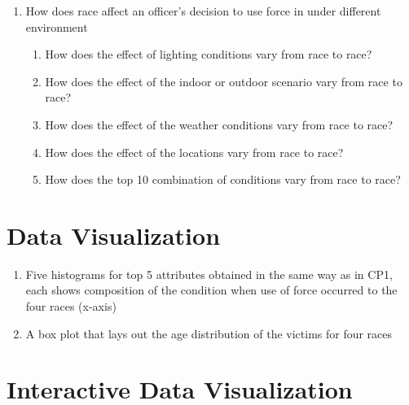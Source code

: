 \documentclass[10pt]{article}
\begin{document}
\begin{enumerate}
\item How does race affect an officer's decision to use force in under different environment

    \begin{enumerate}

    \item How does the effect of lighting conditions vary from race to race?

    \item How does the effect of the indoor or outdoor scenario vary from race to race?

    \item How does the effect of the weather conditions vary from race to race?

    \item How does the effect of the locations vary from race to race?

    \item How does the top 10 combination of conditions vary from race to race?

    \end{enumerate}

\end{enumerate}





\section{Data Visualization}

\begin{enumerate}

\item Five histograms for top 5 attributes obtained in the same way as in CP1, each shows composition of the condition when use of force occurred to the four races (x-axis)

\item A box plot that lays out the age distribution of the victims for four races

\end{enumerate}



\section{Interactive Data Visualization}
\end{document}

